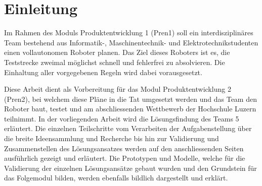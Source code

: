 \section{Einleitung}

Im Rahmen des Moduls Produktentwicklung 1 (Pren1) soll ein interdisziplinäres Team bestehend aus Informatik-, Maschinentechnik- und Elektrotechnikstudenten einen vollautonomen Roboter planen. Das Ziel dieses Roboters ist es, die Teststrecke zweimal möglichst schnell und fehlerfrei zu absolvieren. Die Einhaltung aller vorgegebenen Regeln wird dabei vorausgesetzt.

Diese Arbeit dient als Vorbereitung für das Modul Produktentwicklung 2 (Pren2), bei welchem diese Pläne in die Tat umgesetzt werden und das Team den Roboter baut, testet und am abschliessenden Wettbewerb der Hochschule Luzern teilnimmt.
In der vorliegenden Arbeit wird die Lösungsfindung des Teams 5 erläutert. Die einzelnen Teilschritte vom Verarbeiten der Aufgabenstellung über die breite Ideensammlung und Recherche bis hin zur Validierung und Zusammenstellen des Lösungsansatzes werden auf den anschliessenden Seiten ausführlich gezeigt und erläutert. Die Prototypen und Modelle, welche für die Validierung der einzelnen Lösungsansätze gebaut wurden und den Grundstein für das Folgemodul bilden, werden ebenfalls bildlich dargestellt und erklärt.
